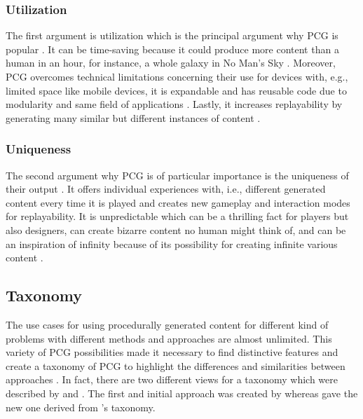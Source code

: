 \documentclass[MGS,Master,english]{twbook}%
\begin{document}
\subsubsection{Utilization}
The first argument is utilization which is the principal argument why \ac{PCG} is popular \cite{pcg::inGameDesign}. It can be time-saving because it could produce more content than a human in an hour, for instance, a whole galaxy in No Man’s Sky \cite{game::noMansSky} \cite{pcg::inGameDesign}. Moreover, \ac{PCG} overcomes technical limitations concerning their use for devices with, e.g., limited space like mobile devices, it is expandable and has reusable code due to modularity and same field of applications \cite{pcg::inGameDesign}. Lastly, it increases replayability by generating many similar but different instances of content \cite{pcg::inGameDesign}.

\subsubsection{Uniqueness}
The second argument why \ac{PCG} is of particular importance is the uniqueness of their output \cite{pcg::inGameDesign}. It offers individual experiences with, i.e., different generated content every time it is played and creates new gameplay and interaction modes for replayability. It is unpredictable which can be a thrilling fact for players but also designers, can create bizarre content no human might think of, and can be an inspiration of infinity because of its possibility for creating infinite various content \cite{pcg::inGameDesign}.


\subsection{Taxonomy}\label{PcgTaxonomy}
The use cases for using procedurally generated content for different kind of problems with different methods and approaches are almost unlimited. This variety of \ac{PCG} possibilities made it necessary to find distinctive features and create a taxonomy of \ac{PCG} to highlight the differences and similarities between approaches \cite{pcg::book}. In fact, there are two different views for a taxonomy which were described by  and . The first and initial approach was created by  whereas  gave the new one derived from 's taxonomy.
\end{document}
